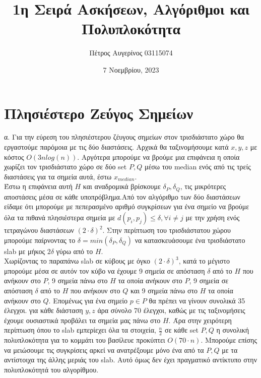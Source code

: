 \documentclass{article} \usepackage[greek,english]{babel}
\title{1η Σειρά Ασκήσεων, Αλγόριθμοι και Πολυπλοκότητα}
\author{Πέτρος Αυγερίνος 03115074}
\date{7 Νοεμβρίου, 2023}
\begin{document}
\maketitle
\tableofcontents
\pagebreak

\section{Πλησιέστερο Ζεύγος Σημείων}
    α. Για την εύρεση του πλησιέστερου ζέυγους σημείων στον τρισδιάστατο χώρο
    θα εργαστούμε παρόμοια με τις δύο διαστάσεις. Αρχικά θα ταξινομήσουμε κατά $x,y,z$ με
    κόστος $O(3nlog(n))$. Αργότερα μπορούμε να βρούμε μια επιφάνεια η οποία χωρίζει
    τον τρισδιάστατο χώρο σε δύο set $P,Q$ μέσω του median ενός από τις τρείς διαστάσεις
    για τα σημεία αυτά, έστω $x_{median}$. \\

    Έστω η επιφάνεια αυτή $H$ και αναδρομικά βρίσκουμε $\delta_{P}, \delta_{Q}$,
    τις μικρότερες αποστάσεις μέσα σε κάθε υποπρόβλημα.Από τον αλγόριθμο των δύο διαστάσεων είδαμε
    ότι μπορούμε με πεπερασμένο αριθμό συγκρίσεων για ένα σημείο να βρούμε όλα τα πιθανά πλησιέστερα σημεία με 
    $d(p_i,p_j) \le \delta, \forall i \neq j$ με την χρήση ενός τετραγώνου διαστάσεων $(2 \cdot \delta)^2$.
    Στην περίπτωση του τρισδιάστατου χώρου μπορούμε παίρνοντας το $\delta = min(\delta_{P},\delta_{Q})$
    να κατασκευάσουμε ένα τρισδιάστατο slab με μήκος $2\delta$ γύρω από το $H$.  \\

    Χωρίζοντας το παραπάνω slab σε κύβους με όγκο $(2\cdot \delta)^3$, κατά το μέγιστο μπορούμε μέσα σε αυτόν τον
    κύβο να έχουμε 9 σημεία σε απόσταση $\delta$ από το $H$ που ανήκουν στο $P$, 9 σημεία πάνω στο $Η$ τα οποία ανήκουν
    στο $P$, 9 σημεία σε απόσταση $\delta$ από το $H$ που ανήκουν στο $Q$ και 9 σημεία πάνω στο $Η$ τα οποία ανήκουν στο $Q$.
    Επομένως για ένα σημείο $p \in P$ θα πρέπει να γίνουν συνολικά 35 έλεγχοι. για κάθε διάσταση $y,z$ άρα σύνολο 70 έλεγχοι,
    καθώς με τις ταξινομήσεις έχουμε ουσιαστικά προβάλει τα σημεία μας πάνω στο $Η$. Άρα στην χειρότερη περίπτωση όπου το slab
    εμπερίεχει όλα τα στοιχεία, $\frac{n}{2}$ σε κάθε set $P,Q$ η συνολική πολυπλοκότητα για το κομμάτι του βασίλευε προκύπτει $Ο(70 \cdot n)$.
    Μπορούμε επίσης να μειώσουμε τις συγκρίσεις αρκεί να ανατρέξουμε μόνο ένα από τα $P,Q$ με τα αντίστοιχα της άλλης μεριάς του slab. Αυτό όμως
    δεν έχει πραγματικό αντίκτυπο στην πολυπλοκότητά του αλγορίθμου. \\
\end{document}
